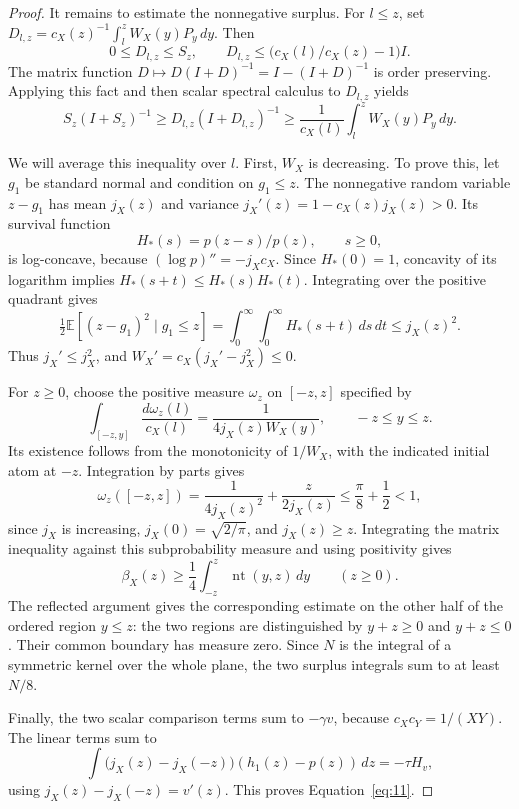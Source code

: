 \begin{proof}
It remains to estimate the nonnegative surplus. For \(l\le z\), set
\(D_{l,z}=c_X(z)^{-1}\int_l^zW_X(y)P_y\,dy\). Then
\[
0\le D_{l,z}\le S_z,\qquad
D_{l,z}\le\bigl(c_X(l)/c_X(z)-1\bigr)I.
\]
The matrix function \(D\mapsto D(I+D)^{-1}=I-(I+D)^{-1}\) is order preserving. Applying this fact and then scalar spectral calculus to \(D_{l,z}\) yields
\[
S_z(I+S_z)^{-1}
\ge D_{l,z}(I+D_{l,z})^{-1}
\ge\frac1{c_X(l)}\int_l^zW_X(y)P_y\,dy.
\]

We will average this inequality over \(l\). First, \(W_X\) is decreasing. To prove this, let \(g_1\) be standard normal and condition on \(g_1\le z\). The nonnegative random variable \(z-g_1\) has mean \(j_X(z)\) and variance
\(j_X'(z)=1-c_X(z)j_X(z)>0\). Its survival function
\[
H_*(s)=p(z-s)/p(z),\qquad s\ge0,
\]
is log-concave, because \((\log p)''=-j_Xc_X\). Since \(H_*(0)=1\), concavity of its logarithm implies
\(H_*(s+t)\le H_*(s)H_*(t)\). Integrating over the positive quadrant gives
\[
\tfrac12\mathbb E[(z-g_1)^2\mid g_1\le z]
=\int_0^\infty\!\int_0^\infty H_*(s+t)\,ds\,dt
\le j_X(z)^2.
\]
Thus \(j_X'\le j_X^2\), and \(W_X'=c_X(j_X'-j_X^2)\le0\).

For \(z\ge0\), choose the positive measure \(\omega_z\) on \([-z,z]\) specified by
\[
\int_{[-z,y]}\frac{d\omega_z(l)}{c_X(l)}
=\frac1{4j_X(z)W_X(y)},\qquad -z\le y\le z.
\]
Its existence follows from the monotonicity of \(1/W_X\), with the indicated initial atom at \(-z\). Integration by parts gives
\[
\omega_z([-z,z])
=\frac1{4j_X(z)^2}+\frac{z}{2j_X(z)}
\le\frac\pi8+\frac12<1,
\]
since \(j_X\) is increasing, \(j_X(0)=\sqrt{2/\pi}\), and \(j_X(z)\ge z\). Integrating the matrix inequality against this subprobability measure and using positivity gives
\[
\beta_X(z)\ge\frac14\int_{-z}^z\operatorname{nt}(y,z)\,dy\qquad(z\ge0).
\]
The reflected argument gives the corresponding estimate on the other half of the ordered region \(y\le z\): the two regions are distinguished by \(y+z\ge0\) and \(y+z\le0\). Their common boundary has measure zero. Since \(N\) is the integral of a symmetric kernel over the whole plane, the two surplus integrals sum to at least \(N/8\).

Finally, the two scalar comparison terms sum to \(-\gamma v\), because \(c_Xc_Y=1/(XY)\). The linear terms sum to
\[
\int\bigl(j_X(z)-j_X(-z)\bigr)(h_1(z)-p(z))\,dz=-\tau H_v,
\]
using \(j_X(z)-j_X(-z)=v'(z)\). This proves Equation~\eqref{eq:11}.
\end{proof}

